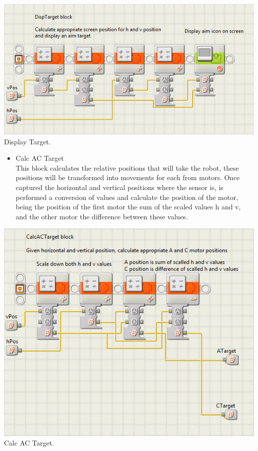 \documentclass[a4paper,11pt]{article}
\begin{document}
			\begin{center}
				\includegraphics[scale=0.8]{img/SW_DispTarget.png}\\
				Display Target.
			\end{center}

	\begin{multicols}{2}

			\begin{itemize}
				\item Calc AC Target\\
				
				This block calculates the relative positions that will take the robot, these positions will be transformed into movements for each from motors. Once captured the horizontal and vertical positions
				where the sensor is, is performed a conversion of values and calculate the position of the motor, being the position of the first motor the sum of the scaled values h and v, and the other motor the difference between these values.
			\end{itemize}

	\end{multicols}

			\begin{center}
				\includegraphics[scale=0.8]{img/SW_CalcACTarget.png}\\
				Calc AC Target.
			\end{center}
\end{document}

